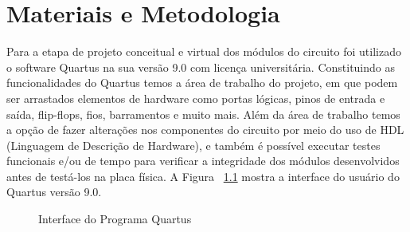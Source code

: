 \documentclass[12pt,a4paper,openany]{abntex2}
\begin{document}
	
\imprimircapa	
\imprimirfolhaderosto

\clearpage
\cleardoublepage
\cleardoublepage

\setcounter{page}{3}

\tableofcontents
\clearpage{\pagestyle{empty}\cleardoublepage}
	
\chapter{Materiais e Metodologia}

  Para a etapa de projeto conceitual e virtual dos módulos do circuito foi utilizado
o software Quartus na sua versão 9.0 com licença universitária.
  Constituindo as funcionalidades do Quartus temos a área de trabalho do projeto,
em que podem ser arrastados elementos de hardware como portas lógicas, pinos de
entrada e saída, flip-flops, fios, barramentos e muito mais.
  Além da área de trabalho temos a opção de fazer alterações nos componentes do
circuito por meio do uso de HDL (Linguagem de Descrição de Hardware), e também é
possível executar testes funcionais e/ou de tempo para verificar a integridade dos
módulos desenvolvidos antes de testá-los na placa física.
  A Figura ~\ref{fig:interface-quartus} mostra a interface do usuário do Quartus versão 9.0.

\begin{figure}[!htp]
	\centering
		\caption{Interface do Programa Quartus}
	\label{fig:interface-quartus}
\end{figure}
\end{document}

